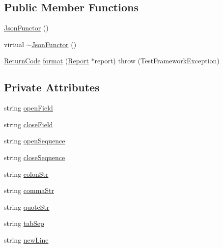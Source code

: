 \subsection*{Public Member Functions}
\begin{DoxyCompactItemize}
\item 
\hyperlink{classit_1_1testbench_1_1formatter_1_1JsonFunctor_ac475795ec8d62b448bc9b3e6faa6de60}{Json\-Functor} ()
\item 
virtual \hyperlink{classit_1_1testbench_1_1formatter_1_1JsonFunctor_ab9a389e2bf20aa12443974c6abd7553f}{$\sim$\-Json\-Functor} ()
\item 
\hyperlink{structit_1_1testbench_1_1data_1_1ReturnCode}{Return\-Code} \hyperlink{classit_1_1testbench_1_1formatter_1_1JsonFunctor_a1f05866bc07e491d920c7c38e3ff6682}{format} (\hyperlink{classit_1_1testbench_1_1data_1_1Report}{Report} $\ast$report)  throw (\-Test\-Framework\-Exception)
\end{DoxyCompactItemize}
\subsection*{Private Attributes}
\begin{DoxyCompactItemize}
\item 
string \hyperlink{classit_1_1testbench_1_1formatter_1_1JsonFunctor_a78a95ca627a66905b3fe89ec0dccfbab}{open\-Field}
\item 
string \hyperlink{classit_1_1testbench_1_1formatter_1_1JsonFunctor_aa97e0fae1afc098f3331a20431ce9c61}{close\-Field}
\item 
string \hyperlink{classit_1_1testbench_1_1formatter_1_1JsonFunctor_a4e8d81e4fb87fe2f1a1b9f469dc1d9f2}{open\-Sequence}
\item 
string \hyperlink{classit_1_1testbench_1_1formatter_1_1JsonFunctor_a94d9c78f645a47ebe5b81b3109240c5f}{close\-Sequence}
\item 
string \hyperlink{classit_1_1testbench_1_1formatter_1_1JsonFunctor_a01058b4edc6d82200275bfe3c605d251}{colon\-Str}
\item 
string \hyperlink{classit_1_1testbench_1_1formatter_1_1JsonFunctor_abaa7923bd1ca962e976ab0b3938fe698}{comma\-Str}
\item 
string \hyperlink{classit_1_1testbench_1_1formatter_1_1JsonFunctor_a1788b787a9482269eaa271f0f4cd35fd}{quote\-Str}
\item 
string \hyperlink{classit_1_1testbench_1_1formatter_1_1JsonFunctor_a7ef70a8a6d49ec93222240ff5a61ce66}{tab\-Sep}
\item 
string \hyperlink{classit_1_1testbench_1_1formatter_1_1JsonFunctor_a822c32fea9d396841837341307382436}{new\-Line}
\end{DoxyCompactItemize}


